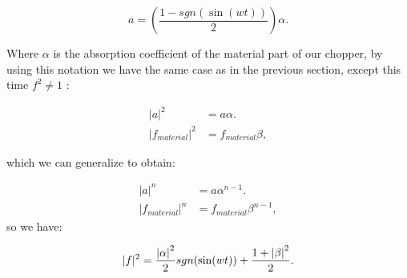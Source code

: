 \documentclass[12pt]{article}
\begin{document}
\vspace{0.5cm}
\begin{equation}
a=\left(\frac{1-sgn(\sin(wt))}{2}\right) \alpha.
\end{equation}
\vspace{0.5cm}

Where $\alpha$ is the absorption coefficient of the material part of our chopper, by using this notation we have the same case as in the previous section, except this time $f^2 \neq 1$ :

\begin{align}
|a|^2&=a \alpha.\\
|f_{material}|^2&=f_{material} \beta,
\end{align}

which we can generalize to obtain:

\begin{align}
|a|^n&=a\alpha^{n-1}.\\
|f_{material}|^n&=f_{material} \beta^{n-1},
\end{align}
so we have:

\begin{equation}
|f|^2=  \frac{\abs{\alpha}^2}{2} sgn(\sin(wt)) +\frac{1+\abs{\beta}^2}{2}.
\end{equation}
\end{document}

